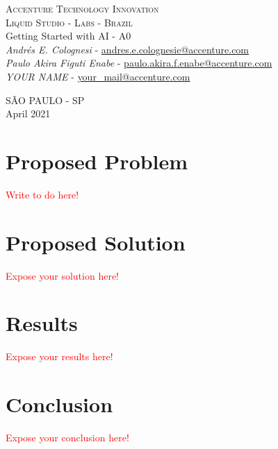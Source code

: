 \documentclass[12pt]{article}
\begin{document}
\begin{titlepage}
\begin{center}
\textsc{ \Large Accenture Technology Innovation}\\ [1.0cm]
\textsc{ \large Liquid Studio - Labs - Brazil}\\[5.5cm]
{ \huge Getting Started with AI - A0} \\[2.0cm]
\emph{Andrés E. Colognesi} - \href{mailto:andres.e.colognesi@accenture.com}{andres.e.colognesie@accenture.com} \\
\emph{Paulo Akira Figuti Enabe} - \href{mailto:paulo.akira.f.enabe@accenture.com}{paulo.akira.f.enabe@accenture.com}
\\[1.0cm]
\emph{YOUR NAME} - \href{mailto:your\_mail@accenture.com}{your\_mail@accenture.com}

\vfill{
\large \uppercase{São Paulo - SP}\\[0.5cm]
April 2021
}

\end{center}
\end{titlepage}

\newpage

\tableofcontents

\newpage

\section{Proposed Problem}

\textcolor{red}{Write to do here!}

\bigbreak


\section{Proposed Solution}

\textcolor{red}{Expose your solution here!}

\bigbreak


\section{Results}

\textcolor{red}{Expose your results here!}

\bigbreak


\section{Conclusion}

\textcolor{red}{Expose your conclusion here!}

\newpage





\end{document}
